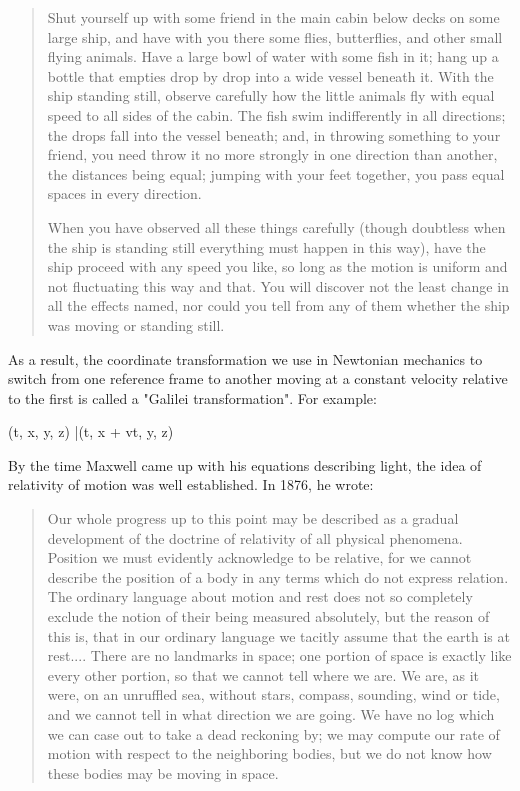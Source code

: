 \begin{quote}
  Shut yourself up with some friend in the main cabin below decks on
  some large ship, and have with you there some flies, butterflies,
  and other small flying animals. Have a large bowl of water with some
  fish in it; hang up a bottle that empties drop by drop into a wide
  vessel beneath it.  With the ship standing still, observe carefully how
  the little animals fly with equal speed to all sides of the cabin.  The
  fish swim indifferently in all directions; the drops fall into the
  vessel beneath; and, in throwing something to your friend, you need
  throw it no more strongly in one direction than another, the distances 
  being equal; jumping with your feet together, you pass equal spaces 
  in every direction.  

  When you have observed all these things carefully (though doubtless 
  when the ship is standing still everything must happen in this way), 
  have the ship proceed with any speed you like, so long as the motion 
  is uniform and not fluctuating this way and that.  You will discover 
  not the least change in all the effects named, nor could you tell 
  from any of them whether the ship was moving or standing still.
\end{quote}
    

As a result, the coordinate transformation we use in Newtonian
mechanics to switch from one reference frame to another moving at 
a constant velocity relative to the first is called a "Galilei
transformation".  For example:

(t, x, y, z) |\to  (t, x + vt, y, z)

By the time Maxwell came up with his equations describing light, 
the idea of relativity of motion was well established.  In 1876,
he wrote:

\begin{quote}
  Our whole progress up to this point may be described as a gradual
  development of the doctrine of relativity of all physical phenomena.
  Position we must evidently acknowledge to be relative, for we cannot
  describe the position of a body in any terms which do not express
  relation.  The ordinary language about motion and rest does not so
  completely exclude the notion of their being measured absolutely, but
  the reason of this is, that in our ordinary language we tacitly assume
  that the earth is at rest.... There are no landmarks in space; one
  portion of space is exactly like every other portion, so that we
  cannot tell where we are.  We are, as it were, on an unruffled sea,
  without stars, compass, sounding, wind or tide, and we cannot tell in
  what direction we are going.  We have no log which we can case out to
  take a dead reckoning by; we may compute our rate of motion with
  respect to the neighboring bodies, but we do not know how these bodies
  may be moving in space.  
\end{quote}
    

